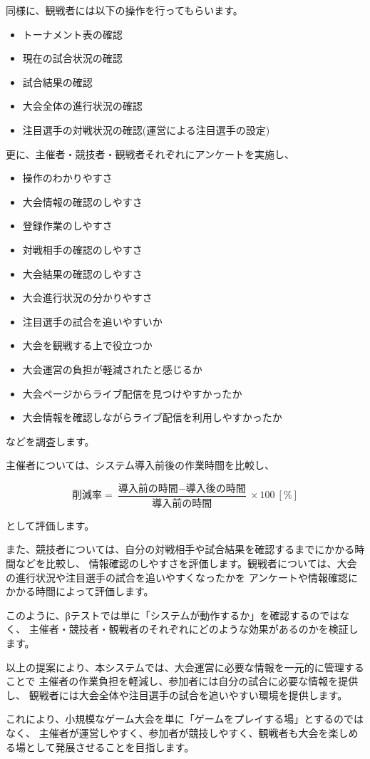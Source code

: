同様に、観戦者には以下の操作を行ってもらいます。

\begin{itemize}
  \item トーナメント表の確認
  \item 現在の試合状況の確認
  \item 試合結果の確認
  \item 大会全体の進行状況の確認
  \item 注目選手の対戦状況の確認(運営による注目選手の設定)
\end{itemize}

更に、主催者・競技者・観戦者それぞれにアンケートを実施し、
\begin{itemize}
  \item 操作のわかりやすさ
  \item 大会情報の確認のしやすさ
  \item 登録作業のしやすさ
  \item 対戦相手の確認のしやすさ
  \item 大会結果の確認のしやすさ
  \item 大会進行状況の分かりやすさ
  \item 注目選手の試合を追いやすいか
  \item 大会を観戦する上で役立つか
  \item 大会運営の負担が軽減されたと感じるか
  \item 大会ページからライブ配信を見つけやすかったか
  \item 大会情報を確認しながらライブ配信を利用しやすかったか
\end{itemize}
などを調査します。

主催者については、システム導入前後の作業時間を比較し、

\begin{equation*}
  \text{削減率} = \frac{\text{導入前の時間} - \text{導入後の時間}}{\text{導入前の時間}} \times 100 \ [\%]
\end{equation*}

として評価します。

また、競技者については、自分の対戦相手や試合結果を確認するまでにかかる時間などを比較し、
情報確認のしやすさを評価します。観戦者については、大会の進行状況や注目選手の試合を追いやすくなったかを
アンケートや情報確認にかかる時間によって評価します。

このように、βテストでは単に「システムが動作するか」を確認するのではなく、
主催者・競技者・観戦者のそれぞれにどのような効果があるのかを検証します。

以上の提案により、本システムでは、大会運営に必要な情報を一元的に管理することで
主催者の作業負担を軽減し、参加者には自分の試合に必要な情報を提供し、
観戦者には大会全体や注目選手の試合を追いやすい環境を提供します。

これにより、小規模なゲーム大会を単に「ゲームをプレイする場」とするのではなく、
主催者が運営しやすく、参加者が競技しやすく、観戦者も大会を楽しめる場として発展させることを目指します。
